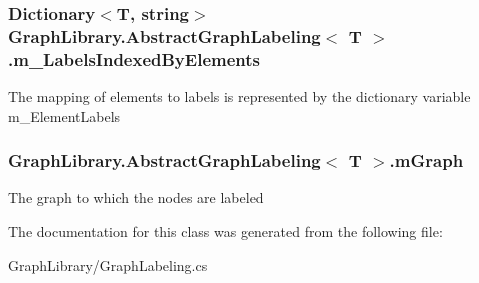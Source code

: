 \subsubsection[{m\+\_\+\+Labels\+Indexed\+By\+Elements}]{\setlength{\rightskip}{0pt plus 5cm}Dictionary$<$T, string$>$ {\bf Graph\+Library.\+Abstract\+Graph\+Labeling}$<$ T $>$.m\+\_\+\+Labels\+Indexed\+By\+Elements\hspace{0.3cm}{\ttfamily [protected]}}\label{class_graph_library_1_1_abstract_graph_labeling_aabc5cd0829948a4a760852dd60b3fc2d}


The mapping of elements to labels is represented by the dictionary variable m\+\_\+\+Element\+Labels 

\hypertarget{class_graph_library_1_1_abstract_graph_labeling_a1e6a6965cad4151fc87e0dd1c3ceb3bf}{}
\subsubsection[{m\+Graph}]{ {\bf Graph\+Library.\+Abstract\+Graph\+Labeling}$<$ T $>$.m\+Graph\hspace{0.3cm}{\ttfamily [protected]}}\label{class_graph_library_1_1_abstract_graph_labeling_a1e6a6965cad4151fc87e0dd1c3ceb3bf}


The graph to which the nodes are labeled 



The documentation for this class was generated from the following file\+:\begin{DoxyCompactItemize}
\item 
Graph\+Library/Graph\+Labeling.\+cs\end{DoxyCompactItemize}
